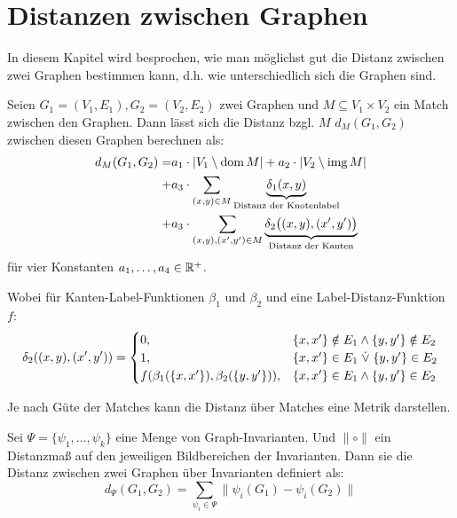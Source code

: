 \chapter{Distanzen zwischen Graphen}

In diesem Kapitel wird besprochen, wie man möglichst gut die Distanz zwischen zwei Graphen bestimmen kann, d.h. wie unterschiedlich sich die Graphen sind.

\begin{definition}
    Seien $ G_1 = (V_1, E_1), G_2 = (V_2, E_2) $ zwei Graphen und $ M \subseteq V_1 \times V_2 $ ein Match zwischen den Graphen.
    Dann lässt sich die Distanz bzgl. $ M $ $ d_M(G_1, G_2) $ zwischen diesen Graphen berechnen als:
    \begin{align*}
        d_M(G_1, G_2) = & a_1 \cdot | V_1 \setminus \operatorname*{dom} M | + a_2 \cdot |V_2 \setminus \operatorname*{img} M| \\
        + & a_3 \cdot \sum_{(x,y) \in M} \underbrace{\delta_1(x, y)}_{\text{Distanz der Knotenlabel}} \\
        + & a_3 \cdot \sum_{(x,y), (x',y') \in M} \underbrace{\delta_2\big((x,y), (x', y')\big)}_{\text{Distanz der Kanten}}
    \end{align*}
    für vier Konstanten $ a_1, \dots, a_4 \in \mathbb{R}^+ $.

    Wobei für Kanten-Label-Funktionen $ \beta_1 $ und $ \beta_2 $ und eine Label-Distanz-Funktion $ f $:
    \begin{equation*}
        \delta_2((x, y), (x', y')) = \begin{cases}
            0, & \{ x, x'\} \notin E_1 \land \{ y, y' \} \notin E_2 \\
            1, & \{ x, x' \} \in E_1 \mathrel{\dot{\lor}} \{ y, y' \} \in E_2 \\
            f(\beta_1(\{ x, x' \}), \beta_2(\{ y, y' \})), & \{ x, x'\} \in E_1 \land \{ y, y' \} \in E_2
        \end{cases}
    \end{equation*}
\end{definition}

\begin{remark}
    Je nach Güte der Matches kann die Distanz über Matches eine Metrik darstellen.
\end{remark}

\begin{definition}
    Sei $ \Psi = \{ \psi_1, \dots, \psi_k \} $ eine Menge von Graph-Invarianten.
    Und $ \| \circ \| $ ein Distanzmaß auf den jeweiligen Bildbereichen der Invarianten.
    Dann sie die Distanz zwischen zwei Graphen über Invarianten definiert als:
    \begin{equation*}
        d_\Psi(G_1, G_2) = \sum_{\psi_i \in \Psi} \| \psi_i(G_1) - \psi_i(G_2) \|
    \end{equation*}
\end{definition}

